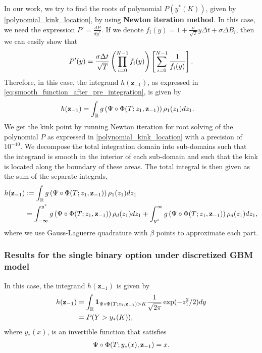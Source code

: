 In our work, we try to  find the roots of polynomial $P(y^{\ast}(K))$, given by \eqref{polynomial_kink_location}, by using \textbf{Newton iteration method}. In this case, we need the expression $P'=\frac{d P}{d y^\ast}$. If we denote $f_i(y)=1+\frac{\sigma}{\sqrt{T}} y \Delta t+ \sigma \Delta B_{i}$, then we can easily show that
\begin{align}\label{polynomial_kink_location_derivative}
	P'(y)=\frac{\sigma \Delta t}{\sqrt{T}} \left( \prod_{i=0}^{N-1} f_i(y)\right) \left[ \sum_{i=0}^{N-1} \frac{1}{f_i(y)}\right].
\end{align}
Therefore, in this case, the integrand $h(\mathbf{z}_{-1})$, as expressed in \eqref{eq:smooth_function_after_pre_integration}, is given by
\begin{align}\label{smoothed_integrand_single_opt_1d}
	h(\mathbf{z}_{-1})&= \int_{\mathbb{R}}  g   \left( \Psi \circ \Phi(T;z_1,\mathbf{z}_{-1})\right)   \rho_1(z_1) dz_1.
\end{align}
We get the kink point by running Newton iteration  for root solving of the polynomial $P$ as expressed in \eqref{polynomial_kink_location} with a precision of $10^{-10}$. We  decompose the total integration domain   into sub-domains such that the integrand is smooth in the interior of each sub-domain  and such that the kink is located along the boundary of these areas. The total integral is then given as the sum of the separate integrals, \ie
\begin{align}
	h(\mathbf{z}_{-1}) &:=  \int_{\mathbb{R}} g \left(\Psi \circ \Phi(T;z_1,\mathbf{z}_{-1})\right)   \rho_1(z_1) dz_1 \nonumber\\
	&=\int_{-\infty}^{y^\ast} g \left( \Psi \circ \Phi(T;z_1,\mathbf{z}_{-1})\right)  \rho_d(z_1) dz_1 +\int_{y^\ast}^{\infty} g \left( \Psi \circ \Phi(T;z_1,\mathbf{z}_{-1})\right) \rho_d(z_1) dz_1,
\end{align}
where we use Gauss-Laguerre quadrature with $\beta$ points to approximate each part.

\subsubsection{Results for the single binary option under discretized GBM model}\label{sec:Results for the binary option example}

In this case, the integrand $h(\mathbf{z}_{-1})$ is given by
\begin{align}\label{smoothed_integrand_binary_opt_2}
	h(\mathbf{z}_{-1})&= \int_{\mathbb{R}} \mathbf{1}_{\Psi \circ \Phi(T;z_1,\mathbf{z}_{-1})>K}\frac{1}{\sqrt{2 \pi}} \operatorname{exp} (-z_1^2/2) dy \nonumber\\
	&=  P(Y>y_{\ast}(K)),
\end{align}
where  $y_{\ast}(x)$, is an invertible function that satisfies 
\begin{align}
	\Psi \circ \Phi (T;y_{\ast}(x),\mathbf{z}_{-1})=x	 .
\end{align}

